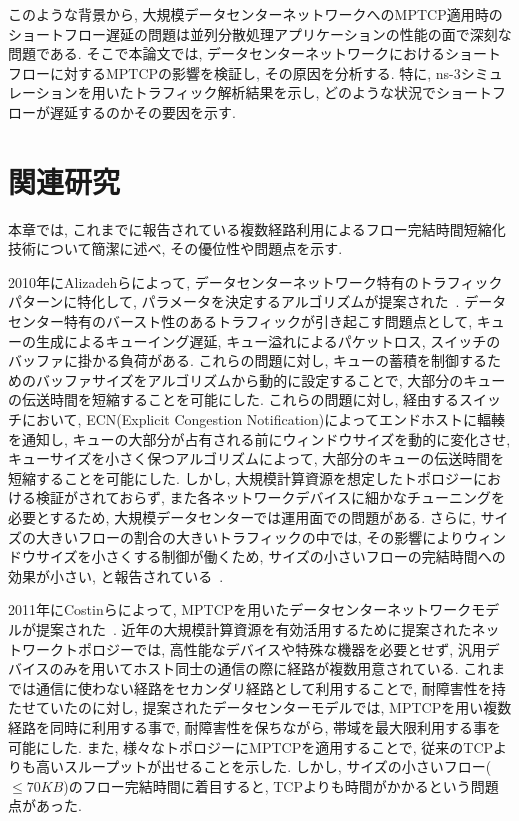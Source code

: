 \documentclass[10pt, a4paper, twocolumn]{jsarticle}
\begin{document}
このような背景から, 大規模データセンターネットワークへのMPTCP適用時のショートフロー遅延の問題は並列分散処理アプリケーションの性能の面で深刻な問題である.
そこで本論文では, データセンターネットワークにおけるショートフローに対するMPTCPの影響を検証し,
その原因を分析する.
特に, ns-3シミュレーションを用いたトラフィック解析結果を示し, どのような状況でショートフローが遅延するのかその要因を示す.


\section{関連研究}
\label{sec:related}
本章では, これまでに報告されている複数経路利用によるフロー完結時間短縮化技術について簡潔に述べ, その優位性や問題点を示す.

2010年にAlizadehらによって, データセンターネットワーク特有のトラフィックパターンに特化して,
パラメータを決定するアルゴリズムが提案された~\cite{dctcp}.
データセンター特有のバースト性のあるトラフィックが引き起こす問題点として, キューの生成によるキューイング遅延, キュー溢れによるパケットロス,
スイッチのバッファに掛かる負荷がある.
これらの問題に対し, キューの蓄積を制御するためのバッファサイズをアルゴリズムから動的に設定することで,
大部分のキューの伝送時間を短縮することを可能にした.
これらの問題に対し, 経由するスイッチにおいて, ECN(Explicit Congestion Notification)によってエンドホストに輻輳を通知し,
キューの大部分が占有される前にウィンドウサイズを動的に変化させ, キューサイズを小さく保つアルゴリズムによって,
大部分のキューの伝送時間を短縮することを可能にした.
しかし, 大規模計算資源を想定したトポロジーにおける検証がされておらず, また各ネットワークデバイスに細かなチューニングを必要とするため,
大規模データセンターでは運用面での問題がある.
さらに, サイズの大きいフローの割合の大きいトラフィックの中では, その影響によりウィンドウサイズを小さくする制御が働くため,
サイズの小さいフローの完結時間への効果が小さい, と報告されている~\cite{p_fab}.

2011年にCostinらによって, MPTCPを用いたデータセンターネットワークモデルが提案された~\cite{improving}.
近年の大規模計算資源を有効活用するために提案されたネットワークトポロジーでは,
高性能なデバイスや特殊な機器を必要とせず, 汎用デバイスのみを用いてホスト同士の通信の際に経路が複数用意されている.
これまでは通信に使わない経路をセカンダリ経路として利用することで, 耐障害性を持たせていたのに対し, 提案されたデータセンターモデルでは,
MPTCPを用い複数経路を同時に利用する事で, 耐障害性を保ちながら, 帯域を最大限利用する事を可能にした.
また, 様々なトポロジーにMPTCPを適用することで, 従来のTCPよりも高いスループットが出せることを示した.
しかし, サイズの小さいフロー($\leq70KB$)のフロー完結時間に着目すると, TCPよりも時間がかかるという問題点があった.
\end{document}
